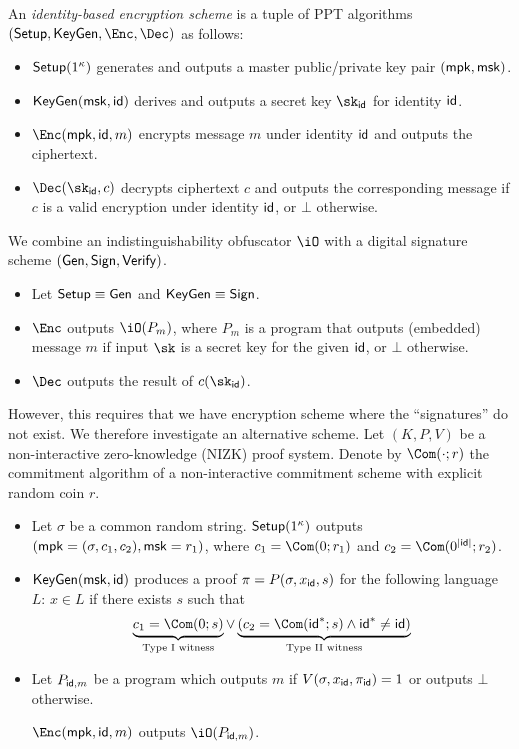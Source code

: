 \begin{definition}
An \emph{identity-based encryption scheme} is a tuple of PPT algorithms
$(\SETUP, \KEYGEN, \Enc, \Dec)$ as follows:
\begin{itemize}
\item
	$\mathsf{Setup}(1^\kappa)$ generates and outputs a master public/private
	key pair $(\mathsf{mpk}, \mathsf{msk})$.
\item
	$\mathsf{KeyGen}(\mathsf{msk}, \mathsf{id})$ derives and outputs a secret key
	$\sk_{\id}$ for identity $\mathsf{id}$.
\item
	$\Enc(\mpk, \id, m)$ encrypts message $m$ under identity $\mathsf{id}$
	and outputs the ciphertext.
\item
	$\Dec(\sk_{\id}, c)$ decrypts ciphertext $c$ and outputs the
	corresponding message if $c$ is a valid encryption under
	identity $\mathsf{id}$, or $\bot$ otherwise.
\end{itemize}
\end{definition}

\newcommand{\SIGN}{\ensuremath{\mathsf{Sign}}}
\newcommand{\VERIFY}{\ensuremath{\mathsf{Verify}}}

We combine an indistinguishability obfuscator $\iO$ with a digital
signature scheme $(\GEN, \SIGN, \VERIFY)$.
\begin{itemize}
\item
	Let $\mathsf{Setup} \equiv \mathsf{Gen}$ and $\KEYGEN \equiv \SIGN$.
\item
	$\Enc$ outputs $\iO(P_m)$, where $P_m$ is a program that
	outputs (embedded) message $m$ if input $\sk$ is a secret key for
	the given $\mathsf{id}$, or $\bot$ otherwise.
\item
	$\Dec$ outputs the result of $c(\sk_{\id})$.
\end{itemize}
However, this requires that we have encryption scheme where the
``signatures'' do not exist.
We therefore investigate an alternative scheme.
%
%
Let $(K, P, V)$ be a non-interactive zero-knowledge (NIZK) proof system.
Denote by $\Com(\cdot ; r)$ the commitment algorithm of a non-interactive
commitment scheme with explicit random coin $r$.

\begin{itemize}
\item
	Let $\sigma$ be a common random string.
	$\mathsf{Setup}(1^\kappa)$ outputs $(\mathsf{mpk} = (\sigma, c_1, c_2), \mathsf{msk} =
	r_1)$, where $c_1 = \Com(0 ; r_1)$ and
	$c_2 = \Com(0^{|\id|} ; r_2)$.

\item
	$\mathsf{KeyGen}(\mathsf{msk}, \mathsf{id})$ produces a proof
	$\pi = P(\sigma, x_{\mathsf{id}}, s)$ for the following language $L$:
	$x \in L$ if there exists $s$ such that
\begin{equation*}
\underbrace{c_1 = \Com(0 ; s)}_{\text{Type I witness}} \lor
\underbrace{\left( c_2 = \Com(\id^* ; s) \land \id^* \ne \id
	\right)}_{\text{Type II witness}}
\end{equation*}

\item
	Let $P_{\mathsf{id},m}$ be a program which outputs $m$ if
	$V(\sigma, x_{\mathsf{id}}, \pi_{\mathsf{id}}) = 1$ or outputs $\bot$ otherwise.

	$\Enc(\mpk, \id, m)$ outputs $\iO(P_{\id,m})$.
\end{itemize}

